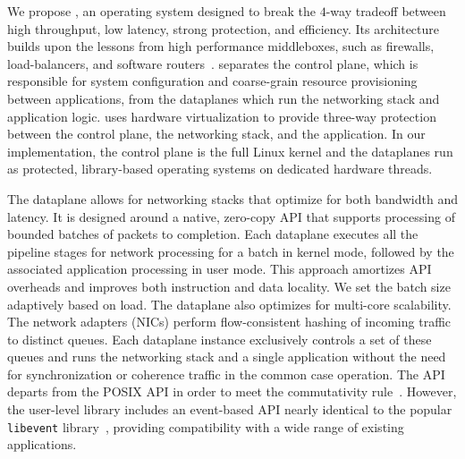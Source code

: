 
We propose \ix, an operating system designed to break the $4$-way
tradeoff between high throughput, low latency, strong protection, and
efficiency. Its architecture builds upon the lessons from high
performance middleboxes, such as firewalls, load-balancers, and
software routers~\cite{routebricks,click}. \ix separates the control
plane, which is responsible for system configuration and coarse-grain
resource provisioning between applications, from the dataplanes which
run the networking stack and application logic. \ix uses hardware
virtualization%
to
provide three-way protection between the control plane, the networking
stack, and the application. In our implementation, the control plane
is the full Linux kernel and the dataplanes run as protected,
library-based operating systems on dedicated hardware threads.

The \ix dataplane allows for networking stacks that optimize for both
bandwidth and latency. It is designed around a native, zero-copy API
that supports processing of bounded batches of packets to
completion. Each dataplane executes all the pipeline stages for
network processing for a batch in kernel mode, followed by the
associated application processing in user mode. This approach
amortizes API overheads and improves both instruction and data
locality. We set the batch size adaptively based on load. The \ix
dataplane also optimizes for multi-core scalability.  The network
adapters (NICs) perform flow-consistent hashing of incoming traffic to
distinct queues. Each dataplane instance exclusively controls a set of
these queues and runs the networking stack and a single application
without the need for synchronization or coherence traffic in the
common case operation. The \ix API departs from the POSIX API in order
to meet the commutativity rule~\cite{DBLP:conf/sosp/ClementsKZMK13}.
However, the \ix user-level library includes an event-based API nearly
identical to the popular \texttt{libevent}
library~\cite{provos2003libevent}, providing compatibility with a wide
range of existing applications.

